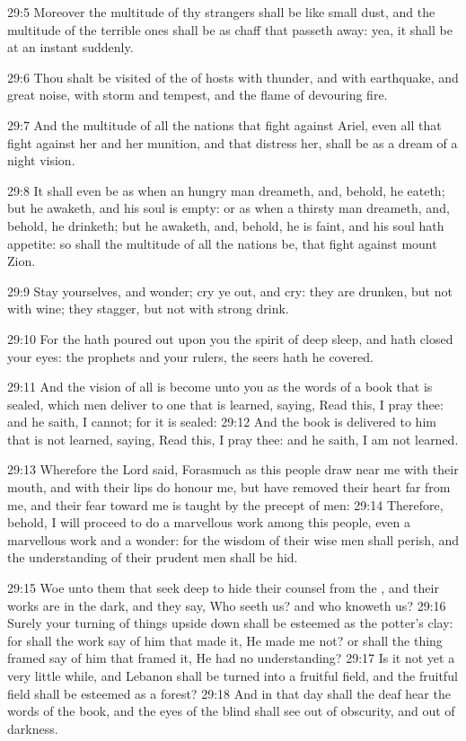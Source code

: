 29:5 Moreover the multitude of thy strangers shall be like small dust,
and the multitude of the terrible ones shall be as chaff that passeth
away: yea, it shall be at an instant suddenly.

29:6 Thou shalt be visited of the \LORD of hosts with thunder, and with
earthquake, and great noise, with storm and tempest, and the flame of
devouring fire.

29:7 And the multitude of all the nations that fight against Ariel,
even all that fight against her and her munition, and that distress
her, shall be as a dream of a night vision.

29:8 It shall even be as when an hungry man dreameth, and, behold, he
eateth; but he awaketh, and his soul is empty: or as when a thirsty
man dreameth, and, behold, he drinketh; but he awaketh, and, behold,
he is faint, and his soul hath appetite: so shall the multitude of all
the nations be, that fight against mount Zion.

29:9 Stay yourselves, and wonder; cry ye out, and cry: they are
drunken, but not with wine; they stagger, but not with strong drink.

29:10 For the \LORD hath poured out upon you the spirit of deep sleep,
and hath closed your eyes: the prophets and your rulers, the seers
hath he covered.

29:11 And the vision of all is become unto you as the words of a book
that is sealed, which men deliver to one that is learned, saying, Read
this, I pray thee: and he saith, I cannot; for it is sealed: 29:12 And
the book is delivered to him that is not learned, saying, Read this, I
pray thee: and he saith, I am not learned.

29:13 Wherefore the Lord said, Forasmuch as this people draw near me
with their mouth, and with their lips do honour me, but have removed
their heart far from me, and their fear toward me is taught by the
precept of men: 29:14 Therefore, behold, I will proceed to do a
marvellous work among this people, even a marvellous work and a
wonder: for the wisdom of their wise men shall perish, and the
understanding of their prudent men shall be hid.

29:15 Woe unto them that seek deep to hide their counsel from the
\LORD, and their works are in the dark, and they say, Who seeth us? and
who knoweth us?  29:16 Surely your turning of things upside down shall
be esteemed as the potter's clay: for shall the work say of him that
made it, He made me not? or shall the thing framed say of him that
framed it, He had no understanding?  29:17 Is it not yet a very little
while, and Lebanon shall be turned into a fruitful field, and the
fruitful field shall be esteemed as a forest?  29:18 And in that day
shall the deaf hear the words of the book, and the eyes of the blind
shall see out of obscurity, and out of darkness.

